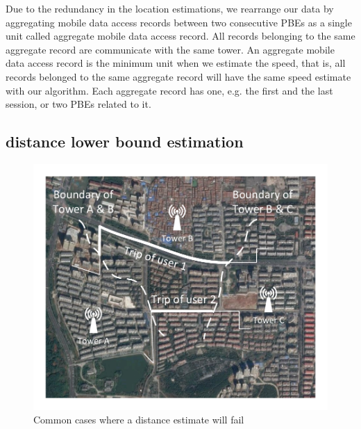 Due to the redundancy in the location estimations, we rearrange our data by aggregating mobile data access records between two consecutive PBEs as a single unit called aggregate mobile data access record. All records belonging to the same aggregate record are communicate with the same tower. An aggregate mobile data access record is the minimum unit when we estimate the speed, that is, all records belonged to the same aggregate record will have the same speed estimate with our algorithm. Each aggregate record has one, e.g. the first and the last session, or two PBEs related to it. %

\subsection{distance lower bound estimation}

\begin{figure}[h]
    \centering
    \includegraphics[width=\linewidth]{./figures/illustrate_cases.pdf}
    \caption{Common cases where a distance estimate will fail}
    \label{fig:illustrate_cases}
\end{figure}

